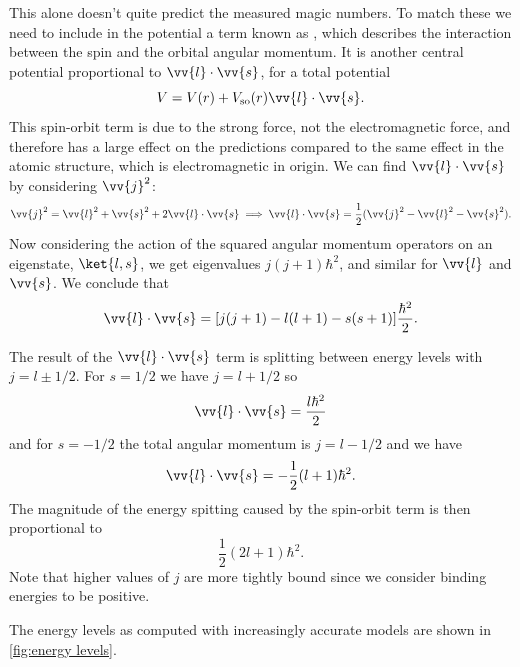 \documentclass[fleqn]{NotesClass}
\begin{document}
    This alone doesn't quite predict the measured magic numbers.
    To match these we need to include in the potential a term known as , which describes the interaction between the spin and the orbital angular momentum.
    It is another central potential proportional to \(\vv{l}\cdot\vv{s}\), for a total potential
    \begin{equation}
        V = V(r) + V_{\mathrm{so}}(r)\vv{l}\cdot\vv{s}.
    \end{equation}
    This spin-orbit term is due to the strong force, not the electromagnetic force, and therefore has a large effect on the predictions compared to the same effect in the atomic structure, which is electromagnetic in origin.
    We can find \(\vv{l}\cdot\vv{s}\) by considering \(\vv{j}^2\):
    \begin{equation}
        \vv{j}^2 = \vv{l}^2 + \vv{s}^2 + 2\vv{l}\cdot\vv{s} \implies \vv{l}\cdot\vv{s} = \frac{1}{2}(\vv{j}^2 - \vv{l}^2 - \vv{s}^2).
    \end{equation}
    Now considering the action of the squared angular momentum operators on an eigenstate, \(\ket{l, s}\), we get eigenvalues \(j(j+1)\hbar^2\), and similar for \(\vv{l}\) and \(\vv{s}\).
    We conclude that
    \begin{equation}
        \vv{l}\cdot\vv{s} = [j(j + 1) - l(l + 1) - s(s + 1)]\frac{\hbar^2}{2}.
    \end{equation}
    
    The result of the \(\vv{l}\cdot\vv{s}\) term is splitting between energy levels with \(j = l \pm 1/2\).
    For \(s = 1/2\) we have \(j = l + 1/2\) so
    \begin{equation}
        \vv{l}\cdot\vv{s} = \frac{l\hbar^2}{2}
    \end{equation}
    and for \(s = -1/2\) the total angular momentum is \(j = l - 1/2\) and we have
    \begin{equation}
        \vv{l}\cdot\vv{s} = -\frac{1}{2}(l + 1)\hbar^2.
    \end{equation}
    The magnitude of the energy spitting caused by the spin-orbit term is then proportional to
    \begin{equation}
        \frac{1}{2}(2l + 1)\hbar^2.
    \end{equation}
    Note that higher values of \(j\) are more tightly bound since we consider binding energies to be positive.
    
    The energy levels as computed with increasingly accurate models are shown in \cref{fig:energy levels}.
    
\end{document}
